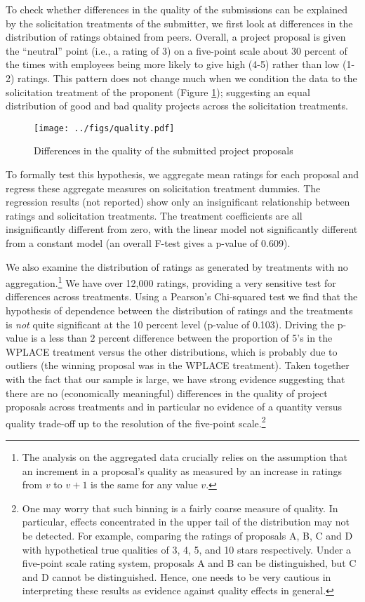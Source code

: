 \documentclass[11pt]{article}
\begin{document}
To check whether differences in the quality of the submissions can be
explained by the solicitation treatments of the submitter, we first look
at differences in the distribution of ratings obtained from peers.
Overall, a project proposal is given the ``neutral'' point (i.e., a
rating of 3) on a five-point scale about 30 percent of the times with
employees being more likely to give high (4-5) rather than low (1-2)
ratings. This pattern does not change much when we condition the data to
the solicitation treatment of the proponent (Figure \ref{fig: quality});
suggesting an equal distribution of good and bad quality projects across
the solicitation treatments.

\begin{figure}
\centering
\caption{Differences in the quality of the submitted project proposals}
\label{fig: quality}
\texttt{[image: ../figs/quality.pdf]}
\end{figure}

To formally test this hypothesis, we aggregate mean ratings for each
proposal and regress these aggregate measures on solicitation treatment
dummies. The regression results (not reported) show only an
insignificant relationship between ratings and solicitation treatments.
The treatment coefficients are all insignificantly different from zero,
with the linear model not significantly different from a constant model
(an overall F-test gives a p-value of 0.609).

We also examine the distribution of ratings as generated by treatments
with no aggregation.\footnote{The analysis on the aggregated data
  crucially relies on the assumption that an increment in a proposal's
  quality as measured by an increase in ratings from \(v\) to \(v+1\) is
  the same for any value \(v\).} We have over 12,000 ratings, providing
a very sensitive test for differences across treatments. Using a
Pearson's Chi-squared test we find that the hypothesis of dependence
between the distribution of ratings and the treatments is \emph{not}
quite significant at the 10 percent level (p-value of 0.103). Driving
the p-value is a less than \(2\) percent difference between the
proportion of 5's in the WPLACE treatment versus the other
distributions, which is probably due to outliers (the winning proposal
was in the WPLACE treatment). Taken together with the fact that our
sample is large, we have strong evidence suggesting that there are no
(economically meaningful) differences in the quality of project
proposals across treatments and in particular no evidence of a quantity
versus quality trade-off up to the resolution of the five-point
scale.\footnote{One may worry that such binning is a fairly coarse
  measure of quality. In particular, effects concentrated in the upper
  tail of the distribution may not be detected. For example, comparing
  the ratings of proposals A, B, C and D with hypothetical true
  qualities of 3, 4, 5, and 10 stars respectively. Under a five-point
  scale rating system, proposals A and B can be distinguished, but C and
  D cannot be distinguished. Hence, one needs to be very cautious in
  interpreting these results as evidence against quality effects in
  general.}
\end{document}
